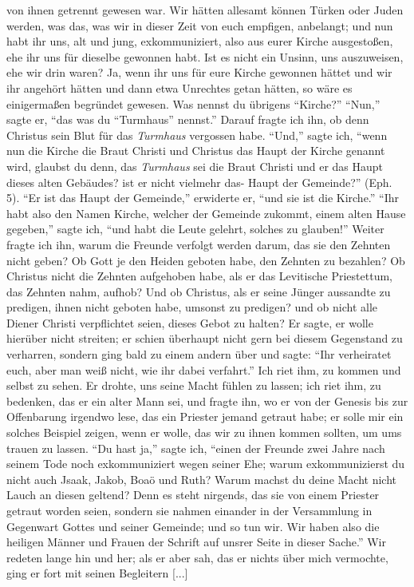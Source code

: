 von ihnen getrennt gewesen war. Wir hätten allesamt können
Türken oder Juden werden, was das, was wir in dieser Zeit von
euch empfigen, anbelangt; und nun habt ihr uns, alt und jung,
exkommuniziert, also aus eurer Kirche ausgestoßen, ehe ihr uns für
dieselbe gewonnen habt. Ist es nicht ein Unsinn, uns auszuweisen,
ehe wir drin waren? Ja, wenn ihr uns für eure Kirche
gewonnen hättet und wir ihr angehört hätten und dann etwa
Unrechtes getan hätten, so wäre es einigermaßen begründet 
gewesen. Was nennst du übrigens "`Kirche?"' "`Nun,"' sagte er,
"`das was du "`Turmhaus"' nennst."' Darauf fragte ich ihn, ob
denn Christus sein Blut für das \textit{Turmhaus} vergossen habe. "`Und,"'
sagte ich, "`wenn nun die Kirche die Braut Christi und Christus das 
Haupt der Kirche genannt wird, glaubst du denn, das \textit{Turmhaus}
sei die Braut Christi und er das Haupt dieses alten Gebäudes?
ist er nicht vielmehr das- Haupt der Gemeinde?"' (Eph. 5). 
"`Er ist das Haupt der Gemeinde,"' erwiderte er, "`und sie ist die
Kirche."' "`Ihr habt also den Namen Kirche, welcher der Gemeinde
zukommt, einem alten Hause gegeben,"' sagte ich, "`und habt die
Leute gelehrt, solches zu glauben!"' Weiter fragte ich ihn, warum
die Freunde verfolgt werden darum, das sie den Zehnten nicht
geben? Ob Gott je den Heiden geboten habe, den Zehnten zu
bezahlen? Ob Christus nicht die Zehnten aufgehoben habe, als
er das Levitische Priestettum, 
das Zehnten nahm, aufhob? Und
ob Christus, als er seine Jünger aussandte zu predigen, ihnen
nicht geboten habe, umsonst zu predigen? und ob nicht alle Diener
Christi verpflichtet seien, dieses Gebot zu halten? Er sagte, er
wolle hierüber nicht streiten; er schien überhaupt nicht gern bei
diesem Gegenstand zu verharren, sondern ging bald zu einem
andern über und sagte: "`Ihr verheiratet euch, aber man weiß
nicht, wie ihr dabei verfahrt."' Ich riet ihm, zu kommen und
selbst zu sehen. Er drohte, uns seine Macht fühlen zu lassen; ich
riet ihm, zu bedenken, das er ein alter Mann sei, und fragte ihn,
wo er von der Genesis bis zur Offenbarung irgendwo lese, das
ein Priester jemand getraut habe; er solle mir ein solches Beispiel
zeigen, wenn er wolle, das wir zu ihnen kommen sollten, um
ums trauen zu lassen. "`Du hast ja,"' sagte ich, "`einen der Freunde
zwei Jahre nach seinem Tode noch exkommuniziert 
wegen seiner Ehe; warum exkommunizierst du nicht auch Jsaak, Jakob, Boaö und
Ruth? Warum machst du deine Macht nicht Lauch an diesen
geltend? Denn es steht nirgends, das sie von einem Priester
getraut worden seien, sondern sie nahmen einander in der 
Versammlung in Gegenwart Gottes und seiner Gemeinde; und so
tun wir. Wir haben also die heiligen Männer und Frauen der
Schrift auf unsrer Seite in dieser Sache."' Wir redeten lange
hin und her; als er aber sah, das er nichts über mich vermochte,
ging er fort mit seinen Begleitern [...]

